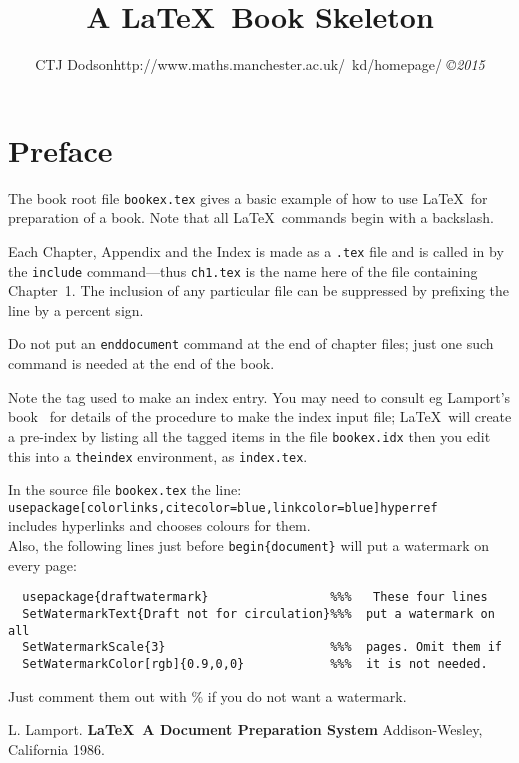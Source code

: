 \documentclass[12pt,reqno]{book}      %
\title{A \LaTeX \ Book Skeleton  }
\author{\htmladdnormallink           %
{CTJ Dodson}{http://www.maths.manchester.ac.uk/~kd/homepage/}
{\small\em \copyright 2015 }}
\date{ }
\begin{document}
\maketitle
\tableofcontents
\listoffigures
\listoftables
\chapter*{Preface}\normalsize
\pagestyle{plain}
The book root file {\tt bookex.tex} gives a basic example of how to
use \LaTeX \ for preparation of a book. Note that all
\LaTeX \ commands begin with a
backslash.

Each
Chapter, Appendix and the Index is made as a {\tt *.tex} file and is
called in by the {\tt include} command---thus {\tt ch1.tex} is
the name here of the file containing Chapter~1. The inclusion of any
particular file can be suppressed by prefixing the line by a
percent sign.


 Do not put an {\tt end{document}} command at the end of chapter files;
just one such command is needed at the end of the book.

Note the tag used to make an index entry. You may need to consult eg Lamport's
book~\cite{lamport} %
for details of the procedure to make the index input
file; \LaTeX \ will create a pre-index by listing all the tagged
items in the file {\tt bookex.idx} then you edit this into
a {\tt theindex} environment, as {\tt index.tex}.

In the source file {\tt bookex.tex} the line:\\
{\tt usepackage[colorlinks,citecolor=blue,linkcolor=blue]{hyperref} } \\
includes hyperlinks and chooses colours for them.\\
Also, the following lines just before 
{\tt begin\{document\}}
will put a watermark on every page:
\begin{verbatim}
  usepackage{draftwatermark}                 %%%   These four lines
  SetWatermarkText{Draft not for circulation}%%%  put a watermark on all
  SetWatermarkScale{3}                       %%%  pages. Omit them if
  SetWatermarkColor[rgb]{0.9,0,0}            %%%  it is not needed.
\end{verbatim}         
Just comment them out with \% if you do not want a watermark. 


\pagestyle{headings}




\begin{thebibliography}{99}
 L. Lamport. {\bf \LaTeX \ A Document Preparation System}
Addison-Wesley, California 1986.
\end{thebibliography}


\end{document}
